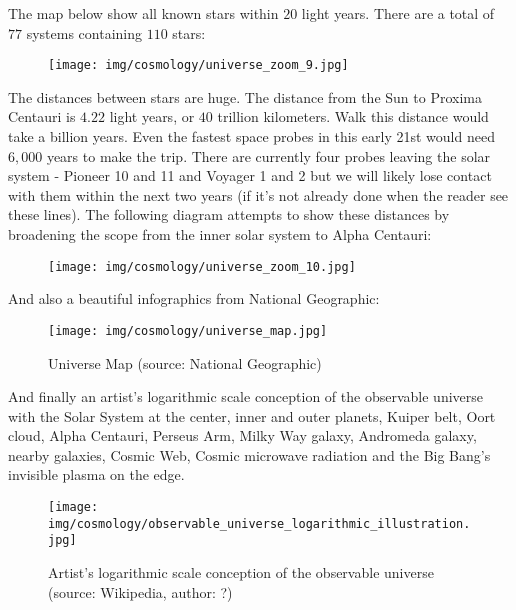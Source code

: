 \begin{enumerate}
		The map below show all known stars within $20$ light years. There are a total of $77$ systems containing $110$ stars:
		\begin{figure}[H]
			\centering
			\texttt{[image: img/cosmology/universe\_zoom\_9.jpg]}
		\end{figure}
		The distances between stars are huge. The distance from the Sun to Proxima Centauri is $4.22$ light years, or $40$ trillion kilometers. Walk this distance would take a billion years. Even the fastest space probes in this early 21st would need $6,000$ years to make the trip. There are currently four probes leaving the solar system - Pioneer 10 and 11 and Voyager 1 and 2 but we will likely lose contact with them within the next two years (if it's not already done when the reader see these lines). The following diagram attempts to show these distances by broadening the scope from the inner solar system to Alpha Centauri:
	\begin{figure}[H]
		\centering
		\texttt{[image: img/cosmology/universe\_zoom\_10.jpg]}
		\end{figure}
	\end{enumerate}
	And also a beautiful infographics from National Geographic:
	\begin{figure}[H]
		\centering
		\texttt{[image: img/cosmology/universe\_map.jpg]}
		\caption[Universe Map]{Universe Map (source: National Geographic)}
	\end{figure}
	And finally an artist's logarithmic scale conception of the observable universe with the Solar System at the center, inner and outer planets, Kuiper belt, Oort cloud, Alpha Centauri, Perseus Arm, Milky Way galaxy, Andromeda galaxy, nearby galaxies, Cosmic Web, Cosmic microwave radiation and the Big Bang's invisible plasma on the edge.
	\begin{figure}[H]
		\centering
		\texttt{[image: img/cosmology/observable\_universe\_logarithmic\_illustration.jpg]}
		\caption[Artist's logarithmic scale conception of the observable universe]{Artist's logarithmic scale conception of the observable universe (source: Wikipedia, author: ?)}
	\end{figure}
	
	\pagebreak
